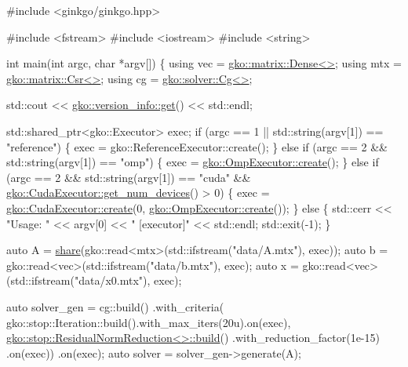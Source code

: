 \begin{DoxyCodeInclude}
\textcolor{preprocessor}{#include <ginkgo/ginkgo.hpp>}

\textcolor{preprocessor}{#include <fstream>}
\textcolor{preprocessor}{#include <iostream>}
\textcolor{preprocessor}{#include <string>}


\textcolor{keywordtype}{int} main(\textcolor{keywordtype}{int} argc, \textcolor{keywordtype}{char} *argv[])
\{
    \textcolor{keyword}{using} vec = \hyperlink{classgko_1_1matrix_1_1Dense}{gko::matrix::Dense<>};
    \textcolor{keyword}{using} mtx = \hyperlink{classgko_1_1matrix_1_1Csr}{gko::matrix::Csr<>};
    \textcolor{keyword}{using} cg = \hyperlink{classgko_1_1solver_1_1Cg}{gko::solver::Cg<>};

    std::cout << \hyperlink{classgko_1_1version__info_a6daeb8a087cfb57fa055526fc133d8eb}{gko::version\_info::get}() << std::endl;

    std::shared\_ptr<gko::Executor> exec;
    \textcolor{keywordflow}{if} (argc == 1 || std::string(argv[1]) == \textcolor{stringliteral}{"reference"}) \{
        exec = gko::ReferenceExecutor::create();
    \} \textcolor{keywordflow}{else} \textcolor{keywordflow}{if} (argc == 2 && std::string(argv[1]) == \textcolor{stringliteral}{"omp"}) \{
        exec = \hyperlink{classgko_1_1OmpExecutor_a33ca05fdd0fc928ee262fc9425304874}{gko::OmpExecutor::create}();
    \} \textcolor{keywordflow}{else} \textcolor{keywordflow}{if} (argc == 2 && std::string(argv[1]) == \textcolor{stringliteral}{"cuda"} &&
               \hyperlink{classgko_1_1CudaExecutor_aef0258494d14de0e56149b920c5173e5}{gko::CudaExecutor::get\_num\_devices}() > 0) \{
        exec = \hyperlink{classgko_1_1CudaExecutor_a2718a92034350650ef406ffdb60db090}{gko::CudaExecutor::create}(0, 
      \hyperlink{classgko_1_1OmpExecutor_a33ca05fdd0fc928ee262fc9425304874}{gko::OmpExecutor::create}());
    \} \textcolor{keywordflow}{else} \{
        std::cerr << \textcolor{stringliteral}{"Usage: "} << argv[0] << \textcolor{stringliteral}{" [executor]"} << std::endl;
        std::exit(-1);
    \}

    \textcolor{keyword}{auto} A = \hyperlink{namespacegko_a3ce296f73db0ff398bdea6009a3a5c58}{share}(gko::read<mtx>(std::ifstream(\textcolor{stringliteral}{"data/A.mtx"}), exec));
    \textcolor{keyword}{auto} b = gko::read<vec>(std::ifstream(\textcolor{stringliteral}{"data/b.mtx"}), exec);
    \textcolor{keyword}{auto} x = gko::read<vec>(std::ifstream(\textcolor{stringliteral}{"data/x0.mtx"}), exec);

    \textcolor{keyword}{auto} solver\_gen =
        cg::build()
            .with\_criteria(
                gko::stop::Iteration::build().with\_max\_iters(20u).on(exec),
                \hyperlink{classgko_1_1stop_1_1ResidualNormReduction}{gko::stop::ResidualNormReduction<>::build}()
                    .with\_reduction\_factor(1e-15)
                    .on(exec))
            .on(exec);
    \textcolor{keyword}{auto} solver = solver\_gen->generate(A);


\end{DoxyCodeInclude}
